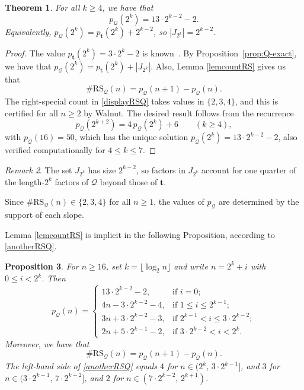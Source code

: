 \documentclass[12pt,reqno]{article}
\theoremstyle{plain}
\newtheorem{theorem}{Theorem}
\newtheorem{proposition}[theorem]{Proposition}
\theoremstyle{definition}
\theoremstyle{remark}
\newtheorem{remark}[theorem]{Remark}
\begin{document}
\begin{theorem}
 For all $k \geq 4$, we have that $$ p_{\mathcal{Q}}(2^k) = 13 \cdot 2^{k-2} - 2. $$
Equivalently, $p_{\mathcal{Q}}(2^k) = p_{\mathbf{t}}(2^k) + 2^{k-2}$, so $|J_{2^k}| = 2^{k-2}$.
\end{theorem}

\begin{proof}
 The value $p_{\mathbf{t}}(2^k) = 3 \cdot 2^k - 2$ is known~\cite{Brlek1989,deLucaVarricchio1989}. By Proposition~\ref{prop:Q-exact}, 
 we have that $p_{\mathcal{Q}}(2^k) = p_{\mathbf{t}}(2^k) + |J_{2^k}|$. Also, Lemma \ref{lemcountRS} gives us that 
\begin{equation}\label{displayRSQ} 
 \#\mathrm{RS}_{\mathcal{Q}}(n) = p_{\mathcal{Q}}(n+1) - p_{\mathcal{Q}}(n). 
\end{equation}
 The right-special count in \eqref{displayRSQ} takes values in $\{2,3,4\}$, and this is certified for all $n\ge 2$ by Walnut. The desired result 
 follows from the recurrence $$ p_{\mathcal{Q}}(2^{k+2}) = 4\, p_{\mathcal{Q}}(2^k) + 6 \qquad (k \geq 4), $$ with 
 $p_{\mathcal{Q}}(16) = 50$, which has the unique solution
 $p_{\mathcal{Q}}(2^k) = 13\cdot 2^{k-2} - 2$, also verified computationally for
 $4\le k\le 7$.
\end{proof}

\begin{remark}
 The set $J_{2^k}$ has size $2^{k-2}$, so factors in $J_{2^k}$ account for one quarter of the length-$2^k$ factors of 
 $\mathcal{Q}$ beyond those of $\mathbf{t}$.
\end{remark}

 Since $\#\mathrm{RS}_{\mathcal{Q}}(n)\in\{2,3,4\}$ for all $n\ge 1$, the values of
 $p_{\mathcal{Q}}$ are determined by the support of each slope.

 Lemma \ref{lemcountRS} is implicit in the following Proposition, according to \eqref{anotherRSQ}. 

\begin{proposition}\label{relabelprop} 
 For $n \geq 16$, set $k = \lfloor \log_2 n \rfloor$ and write $n = 2^k + i$ with $0 \leq i < 2^k$. Then $$ p_{\mathcal{Q}}(n) =
 \begin{cases}
 13 \cdot 2^{k-2} - 2, & \text{if } i = 0; \\
 4n - 3 \cdot 2^{k-2} - 4, & \text{if } 1 \leq i \leq 2^{k-1}; \\ 
 3n + 3 \cdot 2^{k-2} - 3, & \text{if } 2^{k-1} < i \leq 3 \cdot 2^{k-2}; \\ 
 2n + 5 \cdot 2^{k-1} - 2, & \text{if } 3 \cdot 2^{k-2} < i < 2^k.
 \end{cases}
$$ Moreover, we have that 
\begin{equation}\label{anotherRSQ} 
 \#\mathrm{RS}_{\mathcal{Q}}(n) = p_{\mathcal{Q}}(n+1) - p_{\mathcal{Q}}(n). 
\end{equation}
 The left-hand side of \eqref{anotherRSQ} equals $4$ for $n \in (2^k,\, 3 \cdot 2^{k-1}]$, and $3$ for $n \in (3 \cdot 2^{k-1},\, 7 \cdot 
 2^{k-2}]$, and $2$ for $n \in (7 \cdot 2^{k-2},\, 2^{k+1})$. 
\end{proposition}
\end{document}
